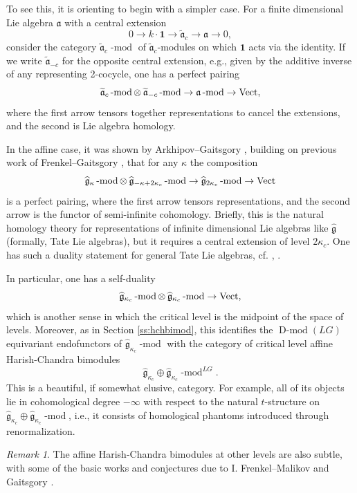 \documentclass[10pt]{amsart}
\newcommand{\fgc}{\widehat{\fg}_{\kappa_c}}
\newcommand{\fgk}{\widehat{\fg}_\kappa}
\newcommand{\fg}{\mathfrak{g}}
\newcommand{\on}{\operatorname}
\renewcommand{\mod}{\on{-mod}}
\newcommand{\Dmod}{\on{D-mod}}
\newcommand{\Vect}{\on{Vect}}
\theoremstyle{remark}
\newtheorem{re}[subsubsection]{Remark}
\newcommand{\gk}{\widehat{\fg}}
\numberwithin{equation}{section}
\renewcommand{\mod}{\operatorname{-mod}}
\begin{document}
To see this, it is orienting to begin with a simpler case. For a finite 
dimensional Lie algebra $\mathfrak{a}$ with a central 
extension 
%
\[
0 \rightarrow k \cdot \mathbf{1} \rightarrow \widetilde{\mathfrak{a}}_c 
\rightarrow \mathfrak{a} \rightarrow 0,
\]
%
consider the category $\widetilde{\mathfrak{a}}_c\mod$ of 
$\widetilde{\mathfrak{a}}_c$-modules on which $\mathbf{1}$ acts via the 
identity. If we write $\widetilde{\mathfrak{a}}_{-c}$ for the opposite central 
extension, e.g., given by the additive inverse of  any representing 2-cocycle, one has a perfect 
pairing 
%
\[
\widetilde{\mathfrak{a}}_c\mod \otimes \hspace{.7mm} 
\widetilde{\mathfrak{a}}_{-c}\mod \rightarrow \mathfrak{a}\mod \rightarrow 
\Vect,
\] 	
%	
where the first arrow tensors together representations to cancel the 
extensions, and the second is Lie 
algebra homology. 

In the affine case, it was shown by Arkhipov--Gaitsgory \cite{ag}, building on previous 
work of Frenkel--Gaitsgory \cite{fg06loc}, that for any $\kappa$ 
the composition
%
\[
\fgk\mod \otimes \hspace{.7mm} \widehat{\fg}_{-\kappa + 2\kappa_c}\mod 
\rightarrow \widehat{\fg}_{2 \kappa_c}\mod \rightarrow \Vect
\]
%
is a perfect pairing, where the first arrow tensors representations, and the 
second arrow is the functor of semi-infinite cohomology. Briefly, this is the natural 
homology theory for representations of infinite dimensional Lie algebras like 
$\gk$ (formally, Tate Lie algebras), but it requires a central extension of level $2\kappa_c$. One has such a duality statement for general Tate Lie algebras, cf. \cite{mys}, \cite{lpw}. 

In particular, one has a self-duality
%
\[
    \fgc\mod \otimes \hspace{.7mm} \fgc\mod \rightarrow \Vect,
\]
%
which is another sense in which the critical level is the midpoint of the 
space of levels. Moreover, as in Section \ref{ss:hchbimod}, this identifies the 
$\Dmod(LG)$ equivariant endofunctors of $\fgc\mod$ with the category of critical level affine 
Harish-Chandra bimodules 
%
\[
      \fgc \oplus \fgc \mod^{LG}.
\]
%
This is a beautiful, if somewhat elusive, category. For example, all of its 
objects lie in cohomological degree $-\infty$ with respect to the natural 
$t$-structure on $\fgc \oplus \fgc\mod$, i.e., it consists of homological 
phantoms introduced through renormalization. 

\begin{re}The affine Harish-Chandra bimodules at other levels 
are also subtle, with some of the basic works and conjectures 
due to I. 
Frenkel--Malikov \cite{frenkelmalikov1} and Gaitsgory \cite{quantum-langlands-summary}. 
\end{re}
\end{document}
